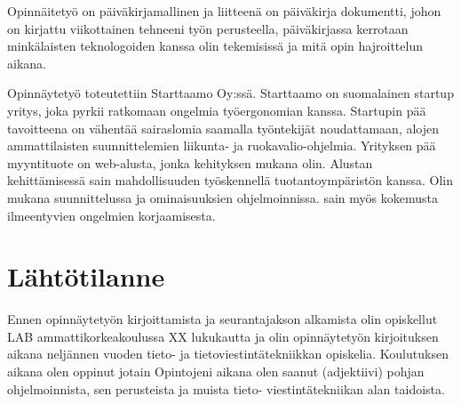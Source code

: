 \documentclass[11pt,a4paper,titlepage,oneside]{article}
\begin{document}
Opinnäitetyö on päiväkirjamallinen ja liitteenä on päiväkirja dokumentti, 
johon on kirjattu viikottainen tehneeni työn perusteella, päiväkirjassa kerrotaan
minkälaisten teknologoiden kanssa olin tekemisissä ja mitä opin hajroittelun aikana.
\medskip


Opinnäytetyö toteutettiin Starttaamo Oy:ssä. Starttaamo on suomalainen startup yritys, joka pyrkii ratkomaan ongelmia työergonomian kanssa.
Startupin pää tavoitteena on vähentää sairaslomia saamalla työntekijät noudattamaan, alojen ammattilaisten suunnittelemien liikunta- ja ruokavalio-ohjelmia. 
Yrityksen pää myyntituote on web-alusta, jonka kehityksen mukana olin.
%
Alustan kehittämisessä sain mahdollisuuden työskennellä tuotantoympäristön kanssa.
Olin mukana suunnittelussa ja ominaisuuksien ohjelmoinnissa. sain myös kokemusta ilmeentyvien ongelmien korjaamisesta.

\medskip






\newpage
\section{Lähtötilanne}         %











Ennen opinnäytetyön kirjoittamista ja seurantajakson alkamista olin opiskellut LAB ammattikorkeakoulussa XX lukukautta ja
olin opinnäytetyön kirjoituksen aikana neljännen vuoden tieto- ja tietoviestintätekniikkan opiskelia.
Koulutuksen aikana olen oppinut jotain 
Opintojeni aikana olen saanut (adjektiivi) pohjan ohjelmoinnista, sen perusteista ja muista tieto- viestintätekniikan alan taidoista.
\end{document}
